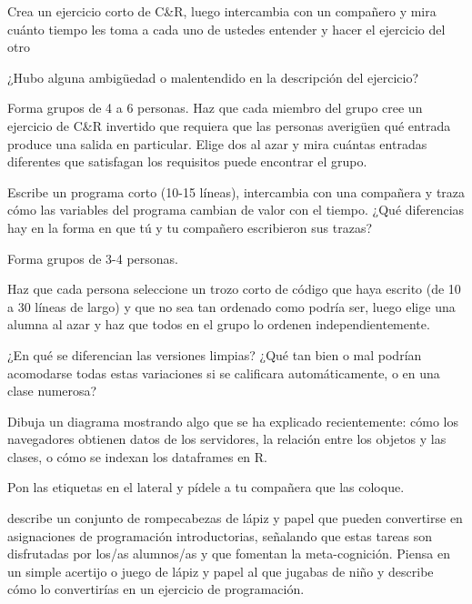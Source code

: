 

Crea un ejercicio corto de C&R, 
luego intercambia con un compañero 
y mira cuánto tiempo les toma a cada uno de ustedes entender y hacer el ejercicio del otro

¿Hubo alguna ambigüedad o malentendido en la descripción del ejercicio?


Forma grupos de 4 a 6 personas.
Haz que cada miembro del grupo cree un ejercicio de C\&R invertido que requiera que las personas averigüen qué entrada produce una salida en particular.
Elige dos al azar 
y mira cuántas entradas diferentes que satisfagan los requisitos puede encontrar el grupo.


Escribe un programa corto (10-15 líneas),
 intercambia con una compañera y 
traza cómo las variables del programa cambian de valor con el tiempo.
¿Qué diferencias hay en la forma en que tú y tu compañero escribieron sus trazas?


Forma grupos de 3-4 personas.

Haz que cada persona seleccione un trozo corto de código que haya escrito  (de 10 a 30 líneas de largo) y que no sea tan ordenado como podría ser, 
luego elige una alumna al azar y haz que todos en el grupo lo ordenen independientemente.

¿En qué se diferencian las versiones limpias?
¿Qué tan bien o mal podrían acomodarse todas estas variaciones si se calificara automáticamente, o en una clase numerosa?


Dibuja un diagrama mostrando algo que se ha explicado recientemente: cómo los navegadores obtienen datos de los servidores, la relación entre los objetos y las clases,
o cómo se indexan los dataframes en R.

Pon las etiquetas en el lateral y pídele a tu compañera que las coloque.


\cite{Butl2017} describe un conjunto de rompecabezas de lápiz y papel que pueden convertirse en asignaciones de programación introductorias, señalando que estas tareas son disfrutadas por los/as alumnos/as y que fomentan la meta-cognición.
Piensa en un simple acertijo o juego de lápiz y papel al que jugabas de niño 
y describe cómo lo convertirías en un ejercicio de programación.

